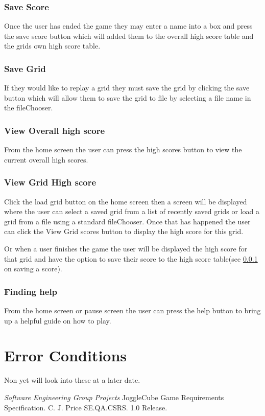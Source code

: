 \documentclass{project}
\begin{document}
		\subsubsection{Save Score} \label{Save score}
			Once the user has ended the game they may enter a name into a box and press the save score button which will added them to the overall high score table and the grids own high score table.
		\subsubsection{Save Grid}	\label{Save grid}
			If they would like to replay a grid they must save the grid by clicking the save button which will allow them to save the grid to file by selecting a file name in the fileChooser.
		\subsubsection{View Overall high score} \label{View Overall highscore}
		From the home screen the user can press the high scores button to view the current overall high scores.
		\subsubsection{View Grid High score} \label{View Grid HigScore}
		Click the load grid button on the home screen then a screen will be displayed where the user can select a saved grid from a list of recently saved grids or load a grid from a file using a standard fileChooser. Once that has happened the user can click the View Grid scores button to display the high score for this grid.
		
		Or when a user finishes the game the user will be displayed the high score for that grid and have the option to save their score to the high score table(see \ref{Save score}  on saving a score).
		\subsubsection{Finding help} \label{Finding help}
		From the home screen or pause screen the user can press the help button to bring up a helpful guide on how to play.
		
\section{Error Conditions}
	Non yet will look into these at a later date. 

\clearpage
{}
\begin{thebibliography}{5}
 \emph{Software Engineering Group Projects}
JoggleCube Game Requirements Specification.
C. J. Price SE.QA.CSRS. 1.0 Release.
\end{thebibliography}
\clearpage
{}
\end{document}

